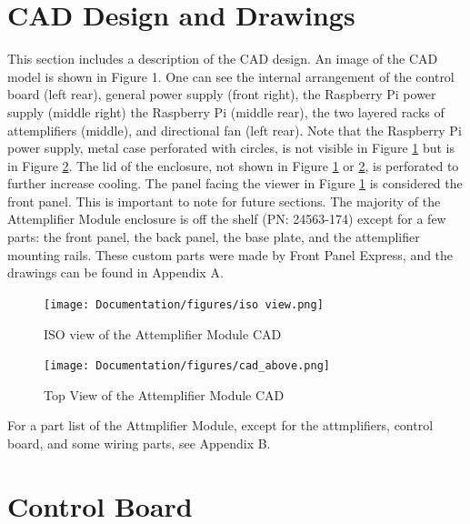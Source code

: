 \documentclass[12pt,a4paper,oneside]{article}
\begin{document}
\section{CAD Design and Drawings}
\label{sec:2}
This section includes a description of the CAD design. An image of the CAD model is shown in Figure 1. One can see the internal arrangement of the control board (left rear), general power supply (front right), the Raspberry Pi power supply (middle right) the Raspberry Pi (middle rear), the two layered racks of attemplifiers (middle), and directional fan (left rear). Note that the Raspberry Pi power supply, metal case perforated with circles, is not visible in Figure \ref{fig:CAD-Iso} but is in Figure \ref{fig:CAD-above}. The lid of the enclosure, not shown in Figure \ref{fig:CAD-Iso} or \ref{fig:CAD-above}, is perforated to further increase cooling. The panel facing the viewer in Figure \ref{fig:CAD-Iso} is considered the front panel. This is important to note for future sections. The majority of the Attemplifier Module enclosure is off the shelf (PN: 24563-174) except for a few parts: the front panel, the back panel, the base plate, and the attemplifier mounting rails. These custom parts were made by Front Panel Express, and the drawings can be found in Appendix A. 

\hfill \break

%
\begin{figure}[H]
\centering
\texttt{[image: Documentation/figures/iso view.png]}
\caption{ISO view of the Attemplifier Module CAD}
\label{fig:CAD-Iso}
\end{figure}
%

%
\begin{figure}[H]
\centering
\texttt{[image: Documentation/figures/cad\_above.png]}
\caption{Top View of the Attemplifier Module CAD}
\label{fig:CAD-above}
\end{figure}
%

For a part list of the Attmplifier Module, except for the attmplifiers,  control board, and some wiring parts, see Appendix B. 


\section{Control Board}
\label{sec:3}
\end{document}
